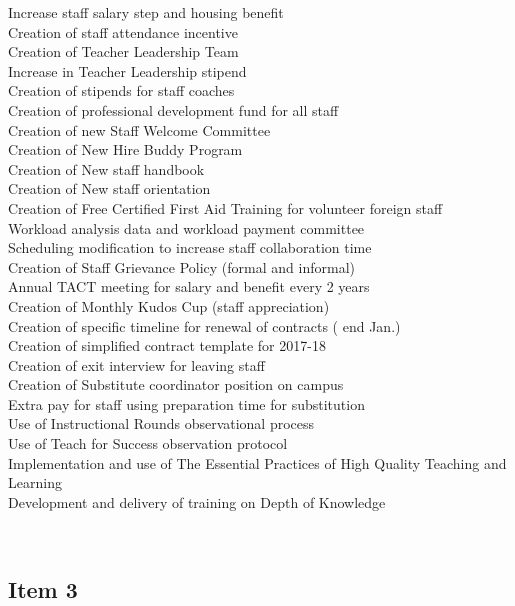 \begin{longtabu}
\parbox[t]{2.8in}{
Increase staff salary step and housing benefit\\
Creation of staff attendance incentive\\
Creation of Teacher Leadership Team\\
Increase in Teacher Leadership stipend\\
Creation of stipends for staff coaches \\
Creation of professional development fund for all staff\\
Creation of new Staff Welcome Committee\\
Creation of New Hire Buddy Program\\
Creation of New staff handbook \\
Creation of New staff orientation \\
Creation of Free Certified First Aid Training for volunteer foreign staff\\
Workload analysis data and workload payment committee\\
Scheduling modification to increase staff collaboration time\\
Creation of Staff Grievance Policy (formal and informal)\\
Annual TACT meeting for salary and benefit every 2 years\\
Creation of Monthly Kudos Cup (staff appreciation)\\
Creation of specific timeline for renewal of contracts ( end Jan.)\\
Creation of simplified contract template for 2017-18\\
Creation of exit interview for leaving staff\\
Creation of Substitute coordinator position on campus\\
Extra pay for staff using preparation time for substitution\\
Use of Instructional Rounds observational process\\
Use of Teach for Success observation protocol\\
Implementation and use of The Essential Practices of High Quality Teaching and Learning\\
Development and delivery of training on Depth of Knowledge } \\
\hline
\end{longtabu}

\subsection{Item 3}

